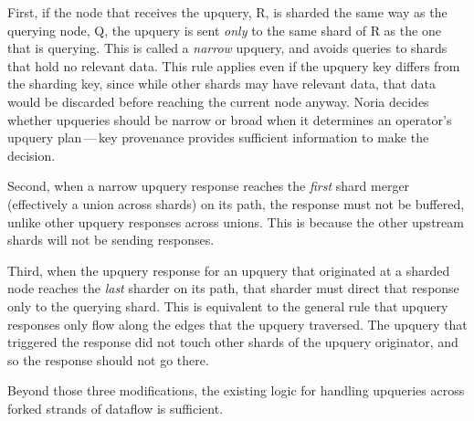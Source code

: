 First, if the node that receives the upquery, R, is sharded the same way as the
querying node, Q, the upquery is sent \emph{only} to the same shard of R as the
one that is querying. This is called a \textit{narrow} upquery, and avoids
queries to shards that hold no relevant data. This rule applies even if the
upquery key differs from the sharding key, since while other shards may have
relevant data, that data would be discarded before reaching the current node
anyway. Noria decides whether upqueries should be narrow or broad when it
determines an operator's upquery plan\,---\,key provenance provides sufficient
information to make the decision.

Second, when a narrow upquery response reaches the \emph{first} shard merger
(effectively a union across shards) on its path, the response must not be
buffered, unlike other upquery responses across unions. This is because
the other upstream shards will not be sending responses.

Third, when the upquery response for an upquery that originated at a sharded
node reaches the \emph{last} sharder on its path, that sharder must direct that
response only to the querying shard. This is equivalent to the general rule that
upquery responses only flow along the edges that the upquery traversed. The
upquery that triggered the response did not touch other shards of the upquery
originator, and so the response should not go there.

Beyond those three modifications, the existing logic for handling upqueries
across forked strands of dataflow is sufficient.

